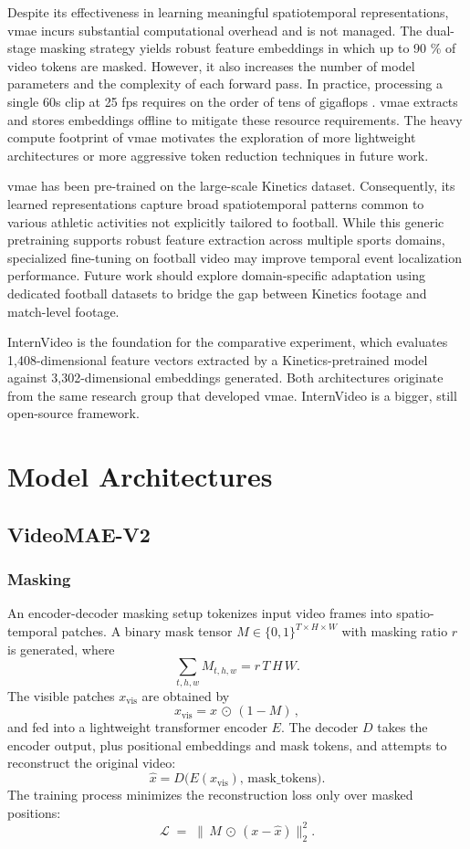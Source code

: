 Despite its effectiveness in learning meaningful spatiotemporal representations, \acrfull{vmae} incurs substantial computational overhead and is not managed. The dual-stage masking strategy yields robust feature embeddings in which up to 90 \% of video tokens are masked. However, it also increases the number of model parameters and the complexity of each forward pass. In practice, processing a single 60s clip at 25 fps requires on the order of tens of gigaflops \cite{wang_videomae_2023}. \acrshort{vmae} extracts and stores embeddings offline to mitigate these resource requirements. The heavy compute footprint of \acrshort{vmae} motivates the exploration of more lightweight architectures or more aggressive token reduction techniques in future work.

\acrshort{vmae} has been pre-trained on the large-scale Kinetics dataset. Consequently, its learned representations capture broad spatiotemporal patterns common to various athletic activities not explicitly tailored to football. While this generic pretraining supports robust feature extraction across multiple sports domains, specialized fine-tuning on football video may improve temporal event localization performance. Future work should explore domain-specific adaptation using dedicated football datasets to bridge the gap between Kinetics footage and match-level footage. 

InternVideo is the foundation for the comparative experiment, which evaluates 1,408-dimensional feature vectors extracted by a Kinetics-pretrained model against 3,302-dimensional embeddings generated. Both architectures originate from the same research group that developed \acrshort{vmae}. InternVideo is a bigger, still open-source framework.



\section{Model Architectures}
\label{sec:model_architectures}

\subsection{VideoMAE-V2}
\label{ssec:videomae_v2}

\subsubsection{Masking}

An encoder-decoder masking setup tokenizes input video frames into spatio-temporal patches. A binary mask tensor \(M\in\{0,1\}^{T\times H\times W}\) with masking ratio \(r\) is generated, where
\[
\sum_{t,h,w} M_{t,h,w} = r\,T\,H\,W.
\]
The visible patches \(x_\text{vis}\) are obtained by
\[
x_\text{vis} = x \,\odot\,(1 - M)\,,
\]
and fed into a lightweight transformer encoder \(E\). The decoder \(D\) takes the encoder output, plus positional embeddings and mask tokens, and attempts to reconstruct the original video:
\[
\hat{x} = D\bigl(E(x_\text{vis}),\,\text{mask\_tokens}\bigr).
\]
The training process minimizes the reconstruction loss only over masked positions:
\[
\mathcal{L} \;=\; \bigl\lVert\,M \,\odot\,(x - \hat{x})\bigr\rVert_2^2.
\]


